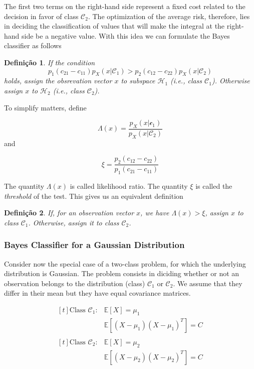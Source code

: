 \documentclass[twocolumn]{article}
\newtheorem{definicao}{Definição}[section]
\begin{document}
		 The first two terms on the right-hand side represent a fixed cost related to the decision in favor of class $ \mathcal{C}_{2} $. The optimization of the average risk, therefore, lies in deciding the classification of values that will make the integral at the right-hand side be a negative value. With this idea we can formulate the Bayes classifier as follows

		 \begin{definicao}
			 If the condition
			 $$ p_{1} (c_{21} - c_{11}) p_{X} (x | \mathcal{C}_{1}) > p_{2} (c_{12} - c_{22}) p_{X} (x | \mathcal{C}_{2}) $$
			 \noindent holds, assign the obsrevation vector $ x $ to subspace $ \mathcal{H}_{1} $ (i.e., class $ \mathcal{C}_{1} $). Otherwise assign $ x $ to $ \mathcal{H}_{2} $ (i.e., class $ \mathcal{C}_{2} $).
		 \end{definicao}

		 To simplify matters, define


		 $$ \Lambda (x) = \dfrac{p_{X} (x | \mathcal{c}_{1})}{ p_{X} (x | \mathcal{C}_{2})} $$
		 \noindent and

		 $$ \xi = \dfrac{p_{2} (c_{12} - c_{22})}{p_{1} (c_{21} - c_{11})} $$

		 The quantity $ \Lambda (x) $ is called likelihood ratio. The quantity $ \xi $ is called the \textit{threshold} of the test. This gives us an equivalent definition

		 \begin{definicao}
			 If, for an observation vector $ x $, we have $ \Lambda (x) > \xi $, assign $ x $ to class $ \mathcal{C}_{1} $. Otherwise, assign it to class $ \mathcal{C}_{2} $.
		 \end{definicao}

	 \subsubsection{Bayes Classifier for a Gaussian Distribution}
		 Consider now the special case of a two-class problem, for which the underlying distribution is Gaussian. The problem consists in diciding whether or not an observation belongs to the distribution (class) $ \mathcal{C}_{1} $ or $ \mathcal{C}_{2} $. We assume that they differ in their mean but they have equal covariance matrices.

		 $$ \begin{aligned}[t]
				 \text{Class } \mathcal{C}_{1}: & \mathbb{E} [X] = \mu_{1}                          \\
				                                & \mathbb{E} [ (X - \mu_{1}) (X - \mu_{1})^{T}] = C \\
			 \end{aligned} $$
		 $$ \begin{aligned}[t]
				 \text{Class } \mathcal{C}_{2}: & \mathbb{E} [X] = \mu_{2}                          \\
				                                & \mathbb{E} [ (X - \mu_{2}) (X - \mu_{2})^{T}] = C \\
			 \end{aligned} $$
\end{document}
